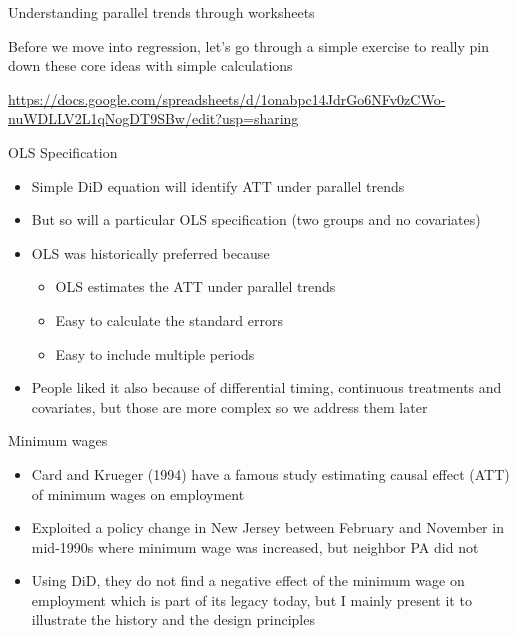 \documentclass{beamer}
\begin{document}
\begin{frame}{Understanding parallel trends through worksheets}

Before we move into regression, let's go through a simple exercise to really pin down these core ideas with simple calculations

\bigskip 

\url{https://docs.google.com/spreadsheets/d/1onabpc14JdrGo6NFv0zCWo-nuWDLLV2L1qNogDT9SBw/edit?usp=sharing}

\end{frame}



\begin{frame}{OLS Specification}
	
	\begin{itemize}
	\item Simple DiD equation will identify ATT under parallel trends
	\item But so will a particular OLS specification (two groups and no covariates)
	\item OLS was historically preferred because
		\begin{itemize}
		\item OLS estimates the ATT under parallel trends
		\item Easy to calculate the standard errors
		\item Easy to include multiple periods
		\end{itemize}
	\item People liked it also because of differential timing, continuous treatments and covariates, but those are more complex so we address them later
	\end{itemize}
\end{frame}

\begin{frame}{Minimum wages}

\begin{itemize}
\item Card and Krueger (1994) have a famous study estimating causal effect (ATT) of minimum wages on employment
\item Exploited a policy change in New Jersey between February and November in mid-1990s where minimum wage was increased, but neighbor PA did not
\item Using DiD, they do not find a negative effect of the minimum wage on employment which is part of its legacy today, but I mainly present it to illustrate the history and the design principles
\end{itemize}

\end{frame}
\end{document}
